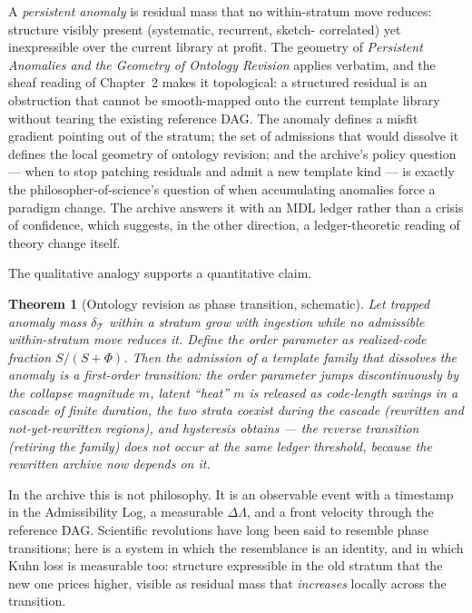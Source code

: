\documentclass[11pt,oneside]{book}
\newtheorem{theorem}{Theorem}[chapter]
\theoremstyle{remark}
\newcommand{\Tem}{\mathcal{T}}
\newcommand{\Phiv}{\Phi}
\newcommand{\Sv}{S}
\begin{document}
A \emph{persistent anomaly} is residual mass that no within-stratum move
reduces: structure visibly present (systematic, recurrent, sketch-
correlated) yet inexpressible over the current library at profit. The
geometry of \emph{Persistent Anomalies and the Geometry of Ontology
Revision} applies verbatim, and the sheaf reading of Chapter~2 makes it
topological: a structured residual is an obstruction that cannot be
smooth-mapped onto the current template library without tearing the
existing reference DAG. The anomaly defines a misfit gradient pointing
out of the stratum; the set of admissions that would dissolve it
defines the local geometry of ontology revision; and the archive's
policy question --- when to stop patching residuals and admit a new
template kind --- is exactly the philosopher-of-science's question of
when accumulating anomalies force a paradigm change. The archive
answers it with an MDL ledger rather than a crisis of confidence,
which suggests, in the other direction, a ledger-theoretic reading of
theory change itself.

The qualitative analogy supports a quantitative claim.

\begin{theorem}[Ontology revision as phase transition, schematic]
Let trapped anomaly mass $\delta_{\Tem}$ within a stratum grow with
ingestion while no admissible within-stratum move reduces it. Define
the order parameter as realized-code fraction
$\Sv / (\Sv + \Phiv)$. Then the admission of a template family that
dissolves the anomaly is a first-order transition: the order parameter
jumps discontinuously by the collapse magnitude $m$, latent
``heat'' $m$ is released as code-length savings in a cascade of finite
duration, the two strata coexist during the cascade (rewritten and
not-yet-rewritten regions), and hysteresis obtains --- the reverse
transition (retiring the family) does not occur at the same ledger
threshold, because the rewritten archive now depends on it.
\end{theorem}

In the archive this is not philosophy. It is an observable event with
a timestamp in the Admissibility Log, a measurable $\Delta\Lambda$,
and a front velocity through the reference DAG. Scientific revolutions
have long been said to resemble phase transitions; here is a system in
which the resemblance is an identity, and in which Kuhn loss is
measurable too: structure expressible in the old stratum that the new
one prices higher, visible as residual mass that \emph{increases}
locally across the transition.
\end{document}
